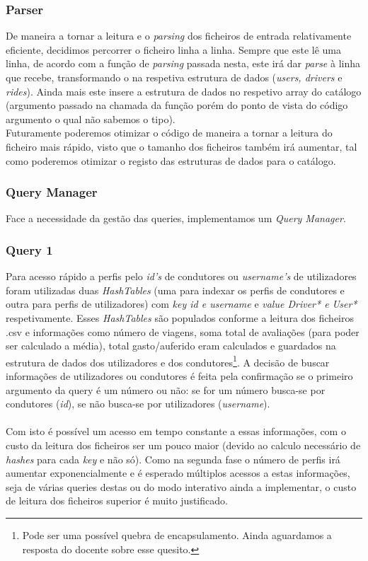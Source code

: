 \documentclass{article}
\begin{document}
        \subsubsection{Parser}
            De maneira a tornar a leitura e o \emph{parsing} dos ficheiros de
            entrada relativamente eficiente, decidimos percorrer o ficheiro linha a linha.
            Sempre que este lê uma linha, de acordo com a função de \emph{parsing} passada
            nesta, este irá dar \emph{parse} à linha que recebe, transformando o na respetiva estrutura de dados (\emph{users, drivers} e \emph{rides}). Ainda mais este insere a estrutura de dados no respetivo array do catálogo (argumento passado na chamada da função porém do ponto de vista do código argumento o qual não sabemos o tipo).
            \\Futuramente poderemos otimizar o código de maneira a tornar a leitura do ficheiro mais rápido, visto que o tamanho dos ficheiros também  irá aumentar, tal como poderemos otimizar o registo das estruturas de dados para o catálogo.
        \subsubsection{Query Manager}
            Face a necessidade da gestão das queries, implementamos um \emph{Query Manager}.
            
        \subsubsection{Query 1}
            Para acesso rápido a perfis pelo \emph{id's} de condutores ou 
            \emph{username's} de utilizadores foram utilizadas duas 
            \emph{HashTables} (uma para indexar os perfis de condutores e outra 
            para perfis de utilizadores) com \emph{key id e username} e 
            \emph{value Driver* e User*} respetivamente. Esses \emph{HashTables}
            são populados conforme a leitura dos ficheiros {.csv} e informações
            como número de viagens, soma total de avaliações (para poder ser 
            calculado a média), total gasto/auferido eram calculados e guardados 
            na estrutura de dados dos utilizadores e dos condutores\footnote{Pode 
            ser uma possível quebra de encapsulamento. Ainda aguardamos a resposta
            do docente sobre esse quesito.}. A decisão de buscar informações de
            utilizadores ou condutores é feita pela confirmação se o primeiro 
            argumento da query é um número ou não: se for um número busca-se por
            condutores (\emph{id}), se não busca-se por utilizadores (\emph{username}).
            \\
            \\Com isto é possível um acesso em tempo constante a essas
            informações, com o custo da leitura dos ficheiros ser um pouco maior
            (devido ao calculo necessário de \emph{hashes} para cada \emph{key} 
            e não só). Como na segunda fase o número de perfis irá aumentar
            exponencialmente e é esperado múltiplos acessos a estas informações, 
            seja de várias queries destas ou do modo interativo ainda a 
            implementar, o custo de leitura dos ficheiros superior é muito 
            justificado.
\end{document}
